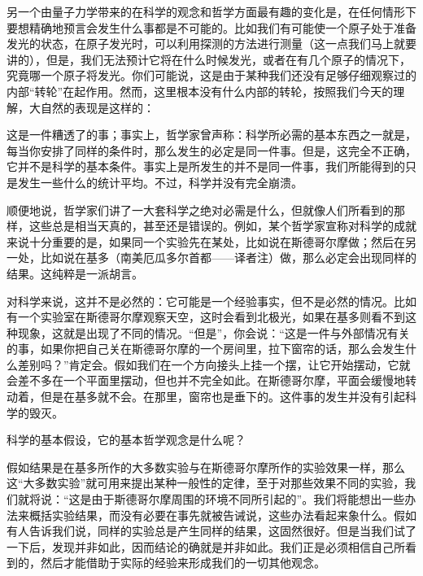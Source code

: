  另一个由量子力学带来的在科学的观念和哲学方面最有趣的变化是，在任何情形下要想精确地预言会发生什么事都是不可能的。比如我们有可能使一个原子处于准备发光的状态，在原子发光时，可以利用探测的方法进行测量（这一点我们马上就要讲的），但是，我们无法预计它将在什么时候发光，或者在有几个原子的情况下，究竟哪一个原子将发光。你们可能说，这是由于某种我们还没有足够仔细观察过的内部“转轮”在起作用。然而，这里根本没有什么内部的转轮，按照我们今天的理解，大自然的表现是这样的：

这是一件糟透了的事；事实上，哲学家曾声称：科学所必需的基本东西之一就是，每当你安排了同样的条件时，那么发生的必定是同一件事。但是，这完全不正确，它并不是科学的基本条件。事实上是所发生的并不是同一件事，我们所能得到的只是发生一些什么的统计平均。不过，科学并没有完全崩溃。

\begin{optional}顺便地说，哲学家们讲了一大套科学之绝对必需是什么，但就像人们所看到的那样，这些总是相当天真的，甚至还是错误的。例如，某个哲学家宣称对科学的成就来说十分重要的是，如果同一个实验先在某处，比如说在斯德哥尔摩做；然后在另一处，比如说在基多（南美厄瓜多尔首都——译者注）做，那么必定会出现同样的结果。这纯粹是一派胡言。

对科学来说，这并不是必然的：它可能是一个经验事实，但不是必然的情况。比如有一个实验室在斯德哥尔摩观察天空，这时会看到北极光，如果在基多则看不到这种现象，这就是出现了不同的情况。“但是”，你会说：“这是一件与外部情况有关的事，如果你把自己关在斯德哥尔摩的一个房间里，拉下窗帘的话，那么会发生什么差别吗？”肯定会。假如我们在一个方向接头上挂一个摆，让它开始摆动，它就会差不多在一个平面里摆动，但也并不完全如此。在斯德哥尔摩，平面会缓慢地转动着，但是在基多就不会。在那里，窗帘也是垂下的。这件事的发生并没有引起科学的毁灭。\end{optional}

科学的基本假设，它的基本哲学观念是什么呢？


假如结果是在基多所作的大多数实验与在斯德哥尔摩所作的实验效果一样，那么这“大多数实验”就可用来提出某种一般性的定律，至于对那些效果不同的实验，我们就将说：“这是由于斯德哥尔摩周围的环境不同所引起的”。我们将能想出一些办法来概括实验结果，而没有必要在事先就被告诫说，这些办法看起来象什么。假如有人告诉我们说，同样的实验总是产生同样的结果，这固然很好。但是当我们试了一下后，发现并非如此，因而结论的确就是并非如此。我们正是必须相信自己所看到的，然后才能借助于实际的经验来形成我们的一切其他观念。

